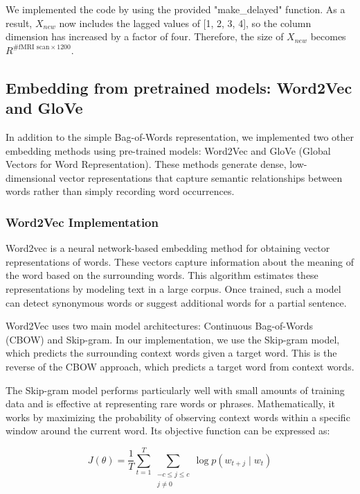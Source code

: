 \documentclass[12pt,letterpaper]{article}
\begin{document}
We implemented the code by using the provided "make\_delayed" function. As a result, $X_{new}$ now includes the lagged values of [1, 2, 3, 4], so the column dimension has increased by a factor of four. Therefore, the size of $X_{new}$ becomes $R^{\#\text{fMRI scan} \times 1200}$.

\subsection{Embedding from pretrained models: Word2Vec and GloVe}

In addition to the simple Bag-of-Words representation, we implemented two other embedding methods using pre-trained models: Word2Vec and GloVe (Global Vectors for Word Representation). These methods generate dense, low-dimensional vector representations that capture semantic relationships between words rather than simply recording word occurrences.

\subsubsection { Word2Vec Implementation} 

Word2vec is a neural network-based embedding method for obtaining vector representations of words. These vectors capture information about the meaning of the word based on the surrounding words. This algorithm estimates these representations by modeling text in a large corpus. Once trained, such a model can detect synonymous words or suggest additional words for a partial sentence.

Word2Vec uses two main model architectures: Continuous Bag-of-Words (CBOW) and Skip-gram. In our implementation, we use the Skip-gram model, which predicts the surrounding context words given a target word. This is the reverse of the CBOW approach, which predicts a target word from context words. 

The Skip-gram model performs particularly well with small amounts of training data and is effective at representing rare words or phrases. Mathematically, it works by maximizing the probability of observing context words within a specific window around the current word. Its objective function can be expressed as:

\begin{equation}
J(\theta) = \frac{1}{T} \sum_{t=1}^{T} \sum_{\substack{-c\leq j \leq c \\ j \neq 0}} \log p(w_{t+j}\mid w_t)
\end{equation}
\end{document}
